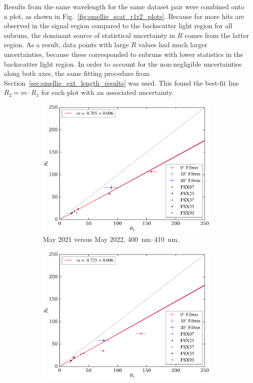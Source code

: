 Results from the same wavelength for the same dataset pair were combined onto a plot, as shown in Fig.~\ref{fig:smellie_scat_r1r2_plots}. Because far more hits are observed in the signal region compared to the backscatter light region for all subruns, the dominant source of statistical uncertainty in $R$ comes from the latter region. As a result, data points with large $R$ values had much larger uncertainties, because these corresponded to subruns with lower statistics in the backscatter light region. In order to account for the non-negligible uncertainties along both axes, the same fitting procedure from Section~\ref{sec:smellie_ext_length_results} was used. This found the best-fit line $R_{2} = m\cdot R_{1}$ for each plot with an associated uncertainty.

\begin{figure}[!th]
    \centering
    \begin{subfigure}{0.48\textwidth}
        \centering
        \includegraphics[width=\textwidth]{5_SMELLIEAnalysis/images/R1_vs_R2_superK_400_410_May2022.pdf}
        \caption{May 2021 versus May 2022, \SIrange{400}{410}{\nm}.}
        \label{fig:smellie_scat_r1r2_sk405_may22}
    \end{subfigure}
    \begin{subfigure}{0.48\textwidth}
        \centering
        \includegraphics[width=\textwidth]{5_SMELLIEAnalysis/images/R1_vs_R2_superK_400_410_Jun2023.pdf}

\end{subfigure}
\end{figure}
